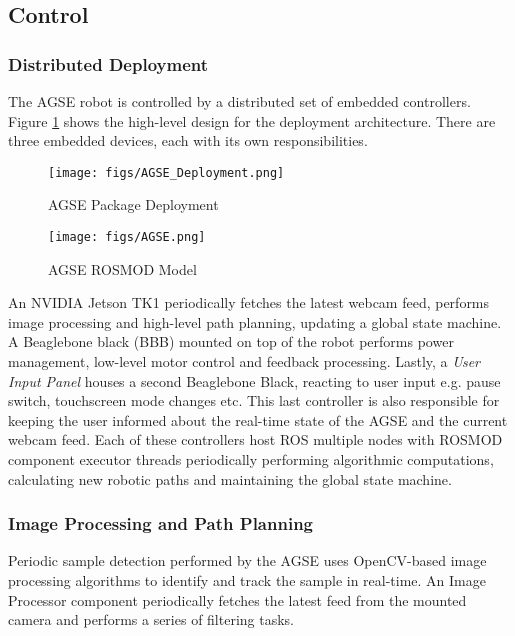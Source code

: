 \subsection{Control}



\subsubsection{Distributed Deployment}

The AGSE robot is controlled by a distributed set of embedded controllers. Figure \ref{fig:AGSE_Deployment} shows the high-level design for the deployment architecture. There are three embedded devices, each with its own responsibilities. 

\begin{figure}[h]
	\centering
	\texttt{[image: figs/AGSE\_Deployment.png]}
	\caption{AGSE Package Deployment}
	\label{fig:AGSE_Deployment}
\end{figure}

\begin{figure*}[t]
	\centering	
	\texttt{[image: figs/AGSE.png]}
	\caption{AGSE ROSMOD Model}
	\label{fig:AGSE}	
\end{figure*}

An NVIDIA Jetson TK1 periodically fetches the latest webcam feed, performs image processing and high-level path planning, updating a global state machine. A Beaglebone black (BBB) mounted on top of the robot performs power management, low-level motor control and feedback processing. Lastly, a \emph{User Input Panel} houses a second Beaglebone Black, reacting to user input e.g. pause switch, touchscreen mode changes etc. This last controller is also responsible for keeping the user informed about the real-time state of the AGSE and the current webcam feed. Each of these controllers host ROS multiple nodes with ROSMOD component executor threads periodically performing algorithmic computations, calculating new robotic paths and maintaining the global state machine.


\subsubsection{Image Processing and Path Planning}

Periodic sample detection performed by the AGSE uses OpenCV-based image processing algorithms to identify and track the sample in real-time. An Image Processor component periodically fetches the latest feed from the mounted camera and performs a series of filtering tasks. 

